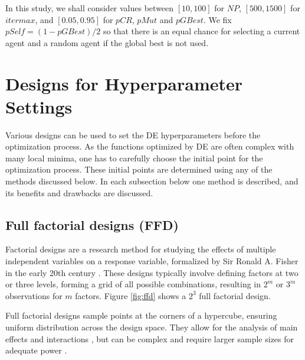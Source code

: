 \documentclass [PhD] {package/uclathes}
\begin{document}
In this study, we shall consider values between $[10,  100]$ for $NP$, $[500, 1500]$ for $itermax$, and $[0.05, 0.95]$ for $pCR$, $pMut$ and $pGBest$. We fix $pSelf = (1 - pGBest)/2$ so that there is an equal chance for selecting a current agent and a random agent if the global best is not used.

\section{Designs for Hyperparameter Settings}\label{sec:DE.designs}
Various designs can be used to set the DE hyperparameters before the optimization process. As the functions optimized by DE are often complex with many local minima, one has to carefully choose the initial point for the optimization process. These initial points are determined using any of the methods discussed below. In each subsection below one method is described, and its benefits and drawbacks are discussed.



\subsection*{Full factorial designs (FFD)}
Factorial designs are a research method for studying the effects of multiple independent variables on a response variable, formalized by Sir Ronald A. Fisher in the early 20th century \parencite{fisher1935}. These designs typically involve defining factors at two or three levels, forming a grid of all possible combinations, resulting in \(2^m\) or \(3^m\) observations for \(m\) factors. Figure \ref{fig:ffd} shows a $2^3$ full factorial design.

Full factorial designs sample points at the corners of a hypercube, ensuring uniform distribution across the design space. They allow for the analysis of main effects and interactions \parencite{montgomery2017design}, but can be complex and require larger sample sizes for adequate power \parencite{tabachnick2019}.
\end{document}
